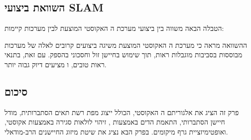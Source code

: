 \subsection{השוואת ביצועי SLAM}
\label{sec:ch04_slam_comparison}

הטבלה הבאה משווה בין ביצועי מערכת ה האקוסטי המוצעת לבין מערכות  קיימות:

\begin{table}[htbp]
\centering
\caption{השוואת ביצועי SLAM: מערכת אקוסטית מול מערכות קיימות. (SLAM performance comparison: proposed acoustic system vs. existing systems.)}
\label{tab:ch04_slam_comparison}
\end{table}

ההשוואה מראה כי מערכת ה האקוסטי המוצעת משיגה ביצועים קרובים לאלה של מערכות מבוססות  בסביבות מוגבלות ראות, תוך שימוש בחיישן זול וחסכוני בהספק. עם זאת, בתנאי ראות טובים,  ו מציעים דיוק גבוה יותר. \cite{MurArtal2015ORB} \cite{Zhang2014LOAM}

\subsection{סיכום}
\label{sec:ch04_summary}

פרק זה הציג את אלגוריתם ה האקוסטי, הכולל ייצוג מפת רשת תאים הסתברותית, מודל חיישן הסתברותי, התאמת הדים באמצעות , זיהוי לולאות סגירה באמצעות  אקוסטי, ואופטימיזציית גרף מיקומים. בפרק הבא נציג את שיטת מיזוג החיישנים הרב-מודאלי. \cite{Thrun2005ProbRobotics} \cite{Grisetti2010g2o} \cite{CrewAIDocs}


